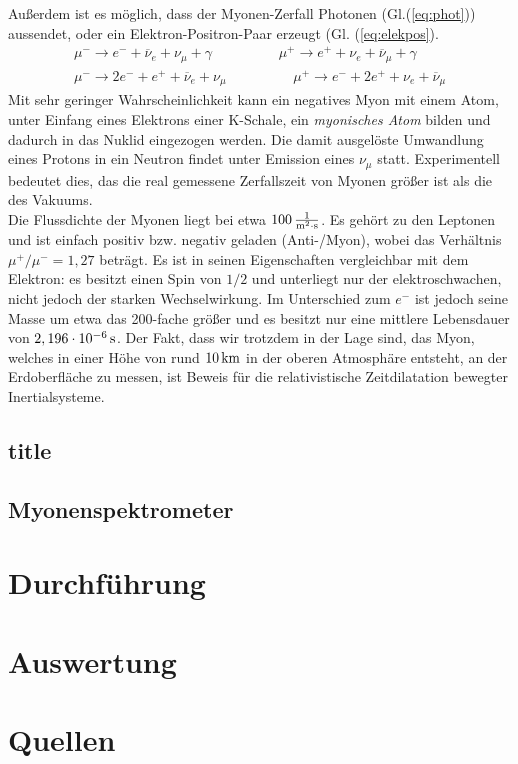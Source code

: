 \documentclass[numbers=noenddot,12pt,a4paper]{scrartcl}
\newcommand{\tilt}[1]{\textit{#1}}
\begin{document}
Außerdem ist es möglich, dass der Myonen-Zerfall Photonen (Gl.(\ref{eq:phot})) aussendet, oder ein Elektron-Positron-Paar erzeugt (Gl. (\ref{eq:elekpos}).
\begin{align}
	\mu^-\rightarrow e^-+\overline{\nu}_e+\nu_\mu+\gamma \hspace{2cm} \mu^+\rightarrow e^++\nu_e+\overline{\nu}_\mu+\gamma \label{eq:phot}\\
	\mu^-\rightarrow 2e^-+e^++\overline{\nu}_e+\nu_\mu \hspace{2cm} \mu^+\rightarrow e^-+2e^++\nu_e+\overline{\nu}_\mu \label{eq:elekpos}
\end{align}
Mit sehr geringer Wahrscheinlichkeit kann ein negatives Myon mit einem Atom, unter Einfang eines Elektrons einer K-Schale, ein \tilt{myonisches Atom} bilden und dadurch in das Nuklid eingezogen werden. Die damit ausgelöste Umwandlung eines Protons in ein Neutron findet unter Emission eines $\nu_\mu$ statt. Experimentell bedeutet dies, das die real gemessene Zerfallszeit von Myonen größer ist als die des Vakuums.\\
Die Flussdichte der Myonen liegt bei etwa $\unit[100]{\frac{1}{m^2\cdot s}}$. Es gehört zu den Leptonen und ist einfach positiv bzw. negativ geladen (Anti-/Myon), wobei das Verhältnis $\mu^+/\mu^-=1,27$ beträgt. Es ist in seinen Eigenschaften vergleichbar mit dem Elektron: es besitzt einen Spin von $1/2$ und unterliegt nur der elektroschwachen, nicht jedoch der starken Wechselwirkung. Im Unterschied zum $e^-$ ist jedoch seine Masse um etwa das 200-fache größer und es besitzt nur eine mittlere Lebensdauer von $\unit[2,196\cdot 10^{-6}]{s}$. Der Fakt, dass wir trotzdem in der Lage sind, das Myon, welches in einer Höhe von rund $\unit[10]{km}$ in der oberen Atmosphäre entsteht, an der Erdoberfläche zu messen, ist Beweis für die relativistische Zeitdilatation bewegter Inertialsysteme.
\subsection{title}
\subsection{Myonenspektrometer}
\section{Durchführung}
\section{Auswertung}
\section{Quellen}
\end{document}
